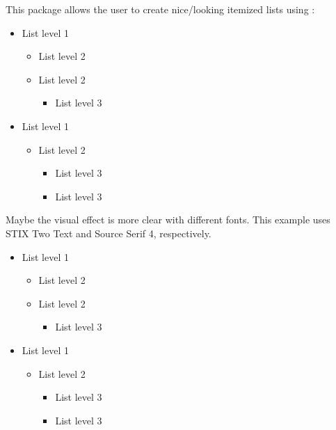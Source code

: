 \documentclass{beery}
\begin{document}
This package allows the user to create nice\-/looking itemized lists using :

\begin{multicols}{2}
  \begin{itemize}
    \item List level 1
    \begin{itemize}
      \item List level 2
      \item List level 2
      \begin{itemize}
        \item List level 3
      \end{itemize}
    \end{itemize}
    \item List level 1
    \begin{itemize}
      \item List level 2
      \begin{itemize}
        \item List level 3
        \item List level 3
      \end{itemize}
    \end{itemize}
  \end{itemize}
\end{multicols}

Maybe the visual effect is more clear with different fonts.
This example uses STIX Two Text and Source Serif 4, respectively.

\begingroup
  \newfontfamilystixtwo
  \begin{multicols}{2}
    \begin{itemize}
      \item List level 1
      \begin{itemize}
        \item List level 2
        \item List level 2
        \begin{itemize}
          \item List level 3
        \end{itemize}
      \end{itemize}
      \item List level 1
      \begin{itemize}
        \item List level 2
        \begin{itemize}
          \item List level 3
          \item List level 3
        \end{itemize}
      \end{itemize}
    \end{itemize}
  \end{multicols}
\endgroup
\end{document}
